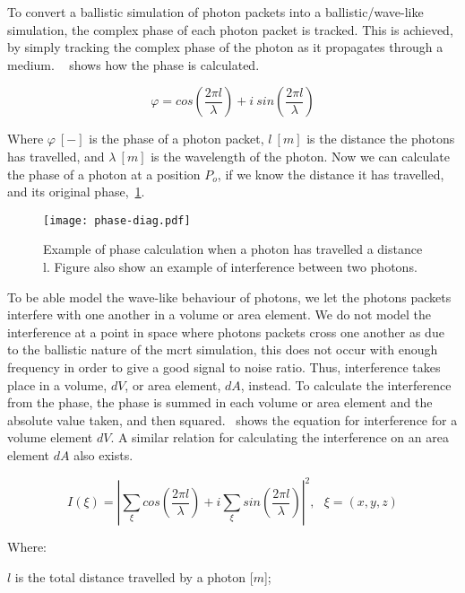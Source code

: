 To convert a ballistic simulation of photon packets into a ballistic/wave-like simulation, the complex phase of each photon packet is tracked.
This is achieved, by simply tracking the complex phase of the photon as it propagates through a medium.
~ shows how the phase is calculated.

\begin{equation}
    \varphi = cos\left(\frac{2 \pi l}{\lambda}\right) + i\ sin\left(\frac{2 \pi l}{\lambda}\right)
    \label{eqn:phase}
\end{equation}

Where $\varphi~[-]$ is the phase of a photon packet, $l\ [m]$ is the distance the photons has travelled, and $\lambda~[m]$ is the wavelength of the photon.
Now we can calculate the phase of a photon at a position $P_o$, if we know the distance it has travelled, and its original phase,~\cref{fig:phase-diag}.

\begin{figure}[!ht]
    \centering
    \texttt{[image: phase-diag.pdf]}
    \caption{Example of phase calculation when a photon has travelled a distance l. Figure also show an example of interference between two photons.}
    \label{fig:phase-diag}
\end{figure}

To be able model the wave-like behaviour of photons, we let the photons packets interfere with one another in a volume or area element. 
We do not model the interference at a point in space where photons packets cross one another as due to the ballistic nature of the \gls*{mcrt} simulation, this does not occur with enough frequency in order to give a good signal to noise ratio. 
Thus, interference takes place in a volume, $dV$, or area element, $dA$, instead.
To calculate the interference from the phase, the phase is summed in each volume or area element and the absolute value taken, and then squared.~ shows the equation for interference for a volume element $dV$. A similar relation for calculating the interference on an area element $dA$ also exists.

\begin{equation}
I(\xi)=\left| \sum\limits_{\xi}cos\left(\frac{2\pi l}{\lambda}\right) + i \sum\limits_{\xi}sin\left(\frac{2\pi l}{\lambda}\right)\right|^2,\ \ \ \xi=(x,y,z)
\label{eqn:intense}
\end{equation}

\noindent Where:

\indent $l$ is the total distance travelled by a photon [$m$];

